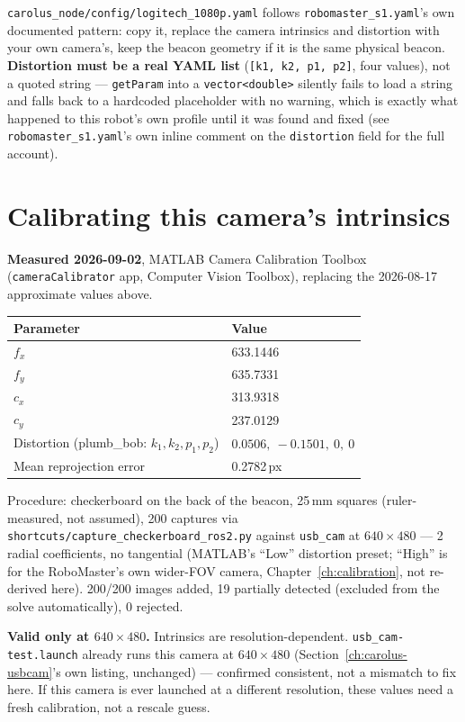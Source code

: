 \documentclass[11pt]{report}
\newenvironment{warningbox}%
  {\begin{lrbox}{\warnbox}\begin{minipage}{0.90\textwidth}}%
  {\end{minipage}\end{lrbox}%
   \begin{center}\fcolorbox{black}{codebg}{\usebox{\warnbox}}\end{center}}
\begin{document}
\texttt{carolus\_node/config/logitech\_1080p.yaml} follows
\texttt{robomaster\_s1.yaml}'s own documented pattern: copy it, replace the
camera intrinsics and distortion with your own camera's, keep the beacon
geometry if it is the same physical beacon. \textbf{Distortion must be a
real YAML list} (\texttt{[k1, k2, p1, p2]}, four values), not a quoted
string --- \texttt{getParam} into a \texttt{vector<double>} silently fails
to load a string and falls back to a hardcoded placeholder with no warning,
which is exactly what happened to this robot's own profile until it was
found and fixed (see \texttt{robomaster\_s1.yaml}'s own inline comment on
the \texttt{distortion} field for the full account).

\section{Calibrating this camera's intrinsics}

\textbf{Measured 2026-09-02}, MATLAB Camera Calibration Toolbox
(\texttt{cameraCalibrator} app, Computer Vision Toolbox), replacing the
2026-08-17 approximate values above.

\begin{center}
\begin{tabular}{ll}
\toprule
Parameter & Value \\
\midrule
$f_x$ & 633.1446 \\
$f_y$ & 635.7331 \\
$c_x$ & 313.9318 \\
$c_y$ & 237.0129 \\
Distortion (plumb\_bob: $k_1,k_2,p_1,p_2$) & $0.0506,\ -0.1501,\ 0,\ 0$ \\
Mean reprojection error & 0.2782\,px \\
\bottomrule
\end{tabular}
\end{center}

Procedure: checkerboard on the back of the beacon, 25\,mm squares (ruler-measured,
not assumed), 200 captures via \texttt{shortcuts/capture\_checkerboard\_ros2.py}
against \texttt{usb\_cam} at $640\times480$ --- 2 radial coefficients, no
tangential (MATLAB's ``Low'' distortion preset; ``High'' is for the
RoboMaster's own wider-FOV camera, Chapter~\ref{ch:calibration}, not
re-derived here). 200/200 images added, 19 partially detected (excluded from
the solve automatically), 0 rejected.

\begin{warningbox}
\textbf{Valid only at $640\times480$.} Intrinsics are resolution-dependent.
\texttt{usb\_cam-test.launch} already runs this camera at $640\times480$
(Section~\ref{ch:carolus-usbcam}'s own listing, unchanged) --- confirmed
consistent, not a mismatch to fix here. If this camera is ever launched at a
different resolution, these values need a fresh calibration, not a rescale
guess.
\end{warningbox}
\end{document}
